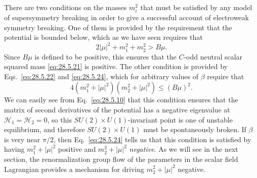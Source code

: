 There are two conditions on the masses \(m_i^2\) that must be satisfied by
any model of supersymmetry breaking in order to give a successful account
of electroweak symmetry breaking. One of them is provided by the
requirement that the potential is bounded below, which as we have seen
requires that
\[
  2|\mu|^2+m_1^2+m_2^2>B\mu.
\]
Since \(B\mu\) is defined to be positive, this ensures that the \(C\)-odd
neutral scalar squared mass \eqref{eq:28.5.21} is positive. The other
condition is provided by Eqs.~\eqref{eq:28.5.22} and
\eqref{eq:28.5.24}, which for arbitrary values of \(\beta\) require that
\begin{equation}
  4(m_1^2+|\mu|^2)(m_2^2+|\mu|^2)\leq(B\mu)^2.
  \tag{28.5.50}\label{eq:28.5.50}
\end{equation}
We can easily see from Eq.~\eqref{eq:28.5.10} that this condition ensures
that the matrix of second derivatives of the potential has a negative
eigenvalue at \(\mathcal{H}_1=\mathcal{H}_2=0\), so this
\(SU(2)\times U(1)\)-invariant point is one of unstable
equilibrium, and therefore \(SU(2)\times U(1)\) must be
spontaneously broken. If \(\beta\) is very near \(\pi/2\), then
Eq.~\eqref{eq:28.5.24} tells us that this condition is satisfied by having
\(m_1^2+|\mu|^2\) positive and \(m_2^2+|\mu|^2\) \textit{negative}. As we
will see in the next section, the renormalization group flow of the
parameters in the scalar field Lagrangian provides a mechanism for driving
\(m_2^2+|\mu|^2\) negative.


